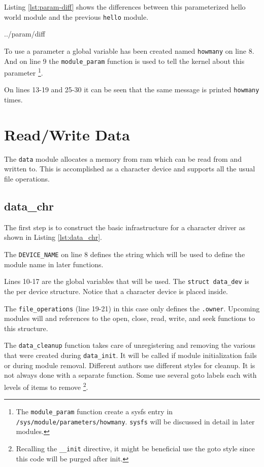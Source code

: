 \documentclass{article}
\begin{document}
Listing \ref{lst:param-diff} shows the differences between this
parameterized hello world module and the previous \verb+hello+ module.


	{../param/diff}

To use a parameter a global variable has been created named \verb+howmany+
on line 8.
And on line 9 the \verb+module_param+ function is used to tell
the kernel about this parameter
\footnote{The \verb+module_param+ function create a sysfs entry
in \verb+/sys/module/parameters/howmany+.  \verb+sysfs+ will
be discussed in detail in later modules.}.

On lines 13-19 and 25-30 it can be seen that the same message
is printed \verb+howmany+ times.

\section{Read/Write Data}

The \verb+data+ module allocates a memory from ram which can
be read from and written to.
This is accomplished as a character device and supports all
the usual file operations.

\subsection{data\_chr}

The first step is to construct the basic infrastructure for
a character driver as shown in Listing \ref{lst:data_chr}.

The \verb+DEVICE_NAME+ on line 8 defines the string which will
be used to define the module name in later functions.

Lines 10-17 are the global variables that will be used.
The \verb+struct data_dev+ is the per device structure.
Notice that a character device is placed inside.

The \verb+file_operations+ (line 19-21) in this case only
defines the \verb+.owner+.  Upcoming modules will and references
to the open, close, read, write, and seek functions to this structure.

The \verb+data_cleanup+ function takes care of unregistering and
removing the various that were created during \verb+data_init+.
It will be called if module initialization fails or during module
removal.  Different authors use different styles for cleanup.
It is not always done with a separate function.
Some use several goto labels each with levels of items to remove
\footnote{Recalling the \verb+__init+ directive, it might be
beneficial use the goto style since this code will be
purged after init.}.
\end{document}
